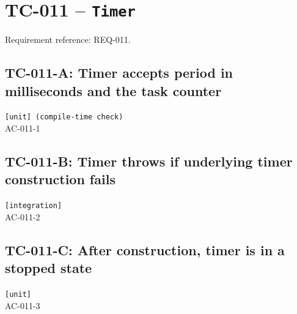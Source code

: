 \section{TC-011 -- \texttt{Timer}}
\label{sec:tc011}

Requirement reference: REQ-011.

\subsection{TC-011-A: Timer accepts period in milliseconds and the task counter}

\begin{tcbox}
 \texttt{[unit] (compile-time check)}\\
 AC-011-1

\medskip
\given{}
\end{tcbox}

\subsection{TC-011-B: Timer throws if underlying timer construction fails}

\begin{tcbox}
 \texttt{[integration]}\\
 AC-011-2

\medskip
{}
\end{tcbox}

\subsection{TC-011-C: After construction, timer is in a stopped state}

\begin{tcbox}
 \texttt{[unit]}\\
 AC-011-3

\medskip
{}
\end{tcbox}

